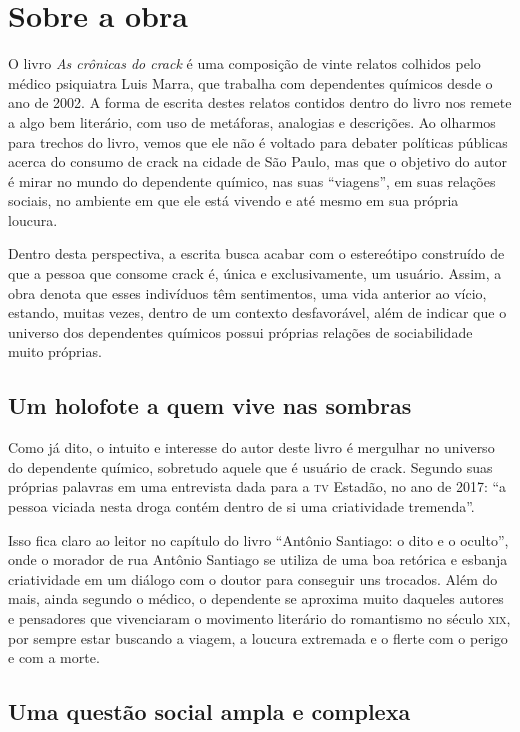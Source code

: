 \pagebreak
\section{Sobre a obra}

O livro \textit{As crônicas do crack} é uma composição de vinte relatos colhidos
pelo médico psiquiatra Luis Marra, que trabalha com dependentes químicos
desde o ano de 2002. A forma de escrita destes relatos contidos dentro
do livro nos remete a algo bem literário, com uso de metáforas,
analogias e descrições. Ao olharmos para trechos do livro, vemos que ele
não é voltado para debater políticas públicas acerca do consumo de crack
na cidade de São Paulo, mas que o objetivo do autor é mirar no mundo do
dependente químico, nas suas ``viagens'', em suas relações sociais, no
ambiente em que ele está vivendo e até mesmo em sua própria loucura.

Dentro desta perspectiva, a escrita busca acabar com o estereótipo
construído de que a pessoa que consome crack é, única e exclusivamente,
um usuário. Assim, a obra denota que esses indivíduos têm sentimentos,
uma vida anterior ao vício, estando, muitas vezes, dentro de um contexto
desfavorável, além de indicar que o universo dos dependentes químicos
possui próprias relações de sociabilidade muito próprias.

\subsection{Um holofote a quem vive nas sombras}

Como já dito, o intuito e interesse do autor deste livro é mergulhar no
universo do dependente químico, sobretudo aquele que é usuário de crack.
Segundo suas próprias palavras em uma entrevista dada para a \textsc{tv} Estadão,
no ano de 2017: ``a pessoa viciada nesta droga contém dentro de si uma
criatividade tremenda''.

Isso fica claro ao leitor no capítulo do livro ``Antônio Santiago: o
dito e o oculto'', onde o morador de rua Antônio Santiago se utiliza de
uma boa retórica e esbanja criatividade em um diálogo com o doutor para
conseguir uns trocados. Além do mais, ainda segundo o médico, o
dependente se aproxima muito daqueles autores e pensadores que
vivenciaram o movimento literário do romantismo no século \textsc{xix}, por
sempre estar buscando a viagem, a loucura extremada e o flerte com o
perigo e com a morte.

\subsection{Uma questão social ampla e complexa}

